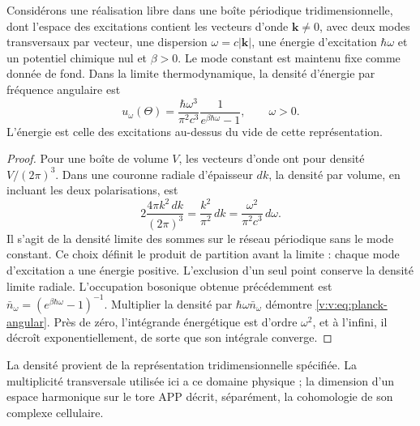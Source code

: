 \begin{proposition}
\label{v:v:prop:ley-espectral}
Considérons une réalisation libre dans une boîte périodique tridimensionnelle,
dont l’espace des excitations contient les vecteurs d’onde
\(\mathbf k\ne0\), avec deux modes transversaux par vecteur, une dispersion
\(\omega=c|\mathbf k|\), une énergie d’excitation \(\hbar\omega\) et
un potentiel chimique nul et \(\beta>0\). Le mode constant est maintenu
fixe comme donnée de fond. Dans la limite thermodynamique, la densité d’énergie
par fréquence angulaire est
\begin{equation}
 u_\omega(\Theta)=\frac{\hbar\omega^3}{\pi^2c^3}
 \frac{1}{e^{\beta\hbar\omega}-1},\qquad \omega>0.
 \label{v:v:eq:planck-angular}
\end{equation}
L’énergie est celle des excitations au-dessus du vide de cette
représentation.
\end{proposition}

\begin{proof}
Pour une boîte de volume \(V\), les vecteurs d’onde ont pour densité
\(V/(2\pi)^3\). Dans une couronne radiale d’épaisseur \(dk\), la densité
par volume, en incluant les deux polarisations, est
\[
 2\frac{4\pi k^2\,dk}{(2\pi)^3}=\frac{k^2}{\pi^2}\,dk
 =\frac{\omega^2}{\pi^2c^3}\,d\omega.
\]
Il s’agit de la densité limite des sommes sur le réseau périodique
sans le mode constant. Ce choix définit le produit de partition
avant la limite : chaque mode d’excitation a une énergie positive.
L’exclusion d’un seul point conserve la densité limite radiale.
L’occupation bosonique obtenue précédemment est
\(\bar n_\omega=(e^{\beta\hbar\omega}-1)^{-1}\).
Multiplier la densité par \(\hbar\omega\bar n_\omega\) démontre
\eqref{v:v:eq:planck-angular}. Près de zéro, l’intégrande énergétique est
d’ordre \(\omega^2\), et à l’infini, il décroît exponentiellement, de sorte
que son intégrale converge.
\end{proof}

La densité provient de la représentation tridimensionnelle spécifiée.
La multiplicité transversale utilisée ici a ce domaine physique ;
la dimension d’un espace harmonique sur le tore APP décrit,
séparément, la cohomologie de son complexe cellulaire.


